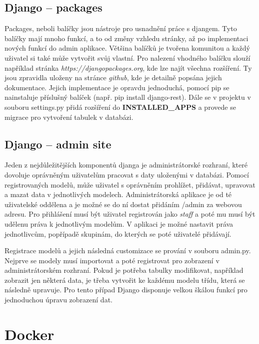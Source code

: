 \newpage

\subsection{Django – packages}

Packages, neboli balíčky jsou nástroje pro usnadnění práce s
djangem. Tyto balíčky mají mnoho funkcí, a to od změny vzhledu
stránky, až po implementaci nových funkcí do admin aplikace. Většina
balíčků je tvořena komunitou a každý uživatel si také může vytvořit
svůj vlastní. Pro nalezení vhodného balíčku slouží například stránka
\textit{https://djangopackages.org}, kde lze najít všechna
rozšíření. Ty jsou zpravidla uloženy na stránce \textit{github}, kde
je detailně popsána jejich dokumentace. Jejich implementace je opravdu
jednoduchá, pomocí pip se nainstaluje příslušný balíček (např. pip
install django-rest). Dále se v projektu v souboru settings.py přidá
rozšíření do \textbf{INSTALLED\_APPS} a provede se migrace pro
vytvoření tabulek v databázi.

\subsection{Django – admin site}

Jeden z nejdůležitějších komponentů djanga je administrátorské
rozhraní, které dovoluje oprávněným uživatelům pracovat s daty
uloženými v databázi. Pomocí registrovaných modelů, může uživatel s
oprávněním prohlížet, přidávat, upravovat a mazat data v jednotlivých
modelech. Administrátorská aplikace je od té uživatelské oddělena a je
možné se do ní dostat přidáním /admin za webovou adresu. Pro
přihlášení musí být uživatel registrován jako \textit{staff} a poté mu
musí být udělenu práva k jednotlivým modelům. V aplikaci je možné
nastavit práva jednotlivcům, popřípadě skupinám, do kterých se poté
uživatelé přidávají.

Registrace modelů a jejich následná customizace se prování v souboru
admin.py. Nejprve se modely musí importovat a poté registrovat pro
zobrazení v administrátorském rozhraní. Pokud je potřeba tabulky
modifikovat, například zobrazit jen některá data, je třeba vytvořit ke
každému modelu třídu, která se následně upravuje. Pro tento případ
Django disponuje velkou škálou funkcí pro jednoduchou úpravu zobrazení
dat.

\newpage

\section{Docker}

